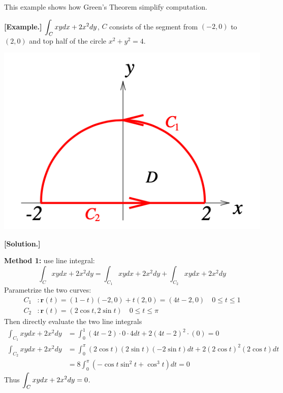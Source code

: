 \documentclass[11pt, a4paper]{MATH2023}
\newcommand{\eg}{\textbf{[Example.] }}
\newcommand{\sol}{\textbf{[Solution.] }}
\begin{document}
\begin{spacing}{1.3}
    
    
    
    \newpage
    {\blue This example shows how Green's Theorem simplify computation.}

    \eg $\displaystyle \int_{C} x y d x+2 x^{2} d y$, $C$ consists of the segment from $(-2,0)$ to $(2,0)$ and top half of the circle
    $x^2+y^2=4$.
    \begin{center}
        \includegraphics[scale=0.45]{images/Ch16-ex4.2.png}
    \end{center}
    
    \sol 
    
    {\bf Method 1:} use line integral: 
    $$ \int_{C} x y d x+2 x^{2} d y=\int_{C_{1}} x y d x+2 x^{2} d y+\int_{C_{2}} x y d x+2 x^{2} d y$$
    Parametrize the two curves:
    \begin{align*}
        C_{1} &: \mathbf{r}(t)=(1-t)(-2,0)+t(2,0)=(4 t-2,0) \quad 0 \leqslant t \leqslant 1 \\
        C_{2} &: \mathbf{r}(t)=(2 \cos t, 2 \sin t) \quad 0 \leqslant t \leqslant \pi
    \end{align*}
    Then directly evaluate the two line integrals
    \begin{align*}
        \int_{C_{1}} x y d x+2 x^{2} d y &=\int_{0}^{1}(4 t-2) \cdot 0 \cdot 4 d t+2(4 t-2)^{2} \cdot(0)=0 \\
        \int_{C_{2}} x y d x+2 x^{2} d y &=\int_{0}^{\pi}(2 \cos t)(2 \sin t)(-2 \sin t) d t+2(2 \cos t)^{2}(2 \cos t) d t \\
        &=8 \int_{0}^{\pi}\left(-\cos t \sin ^{2} t+\cos ^{3} t\right) d t=0
    \end{align*}
    Thus $\displaystyle \int_{C} x y d x+2 x^{2} d y=0$.
    

\end{spacing}
\end{document}
